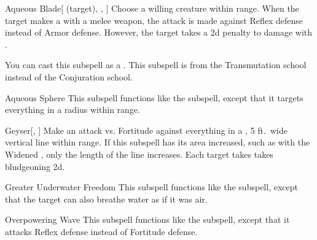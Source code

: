 \begin{ability}[\nth{2}]{Aqueous Blade}[ (target), , ]
Choose a willing creature within \rngclose range.
When the target makes a  with a melee weapon, the attack is made against Reflex defense instead of Armor defense.
However, the target takes a \minus2d penalty to damage with .

You can cast this subspell as a .
This subspell is from the Transmutation school instead of the Conjuration school.
\end{ability}
\vspace{0.25em}



\begin{ability}[\nth{2}]{Aqueous Sphere}
This subspell functions like the  subspell, except that it targets everything in a \areasmall radius within \rngclose range.
\end{ability}
\vspace{0.25em}



\begin{ability}[\nth{2}]{Geyser}[, ]
Make an attack vs. Fortitude against everything in a \arealarge, 5 ft.\ wide vertical line within \rngmed range.
If this subspell has its area increased, such as with the Widened , only the length of the line increases.
\hit Each target takes takes bludgeoning  \plus2d.
\end{ability}
\vspace{0.25em}



\begin{ability}[\nth{3}]{Greater Underwater Freedom}
This subspell functions like the  subspell, except that the target can also breathe water as if it was air.
\end{ability}
\vspace{0.25em}



\begin{ability}[\nth{3}]{Overpowering Wave}
This subspell functions like the  subspell, except that it attacks Reflex defense instead of Fortitude defense.
\end{ability}
\vspace{0.25em}



